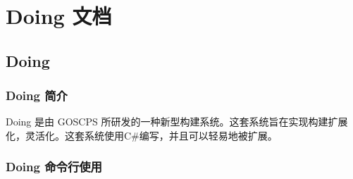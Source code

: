 \chapter{Doing 文档}
\section{Doing}
\subsection{Doing 简介}

Doing 是由 GOSCPS 所研发的一种新型构建系统。这套系统旨在实现构建扩展化，灵活化。这套系统使用C\#{}编写，并且可以轻易地被扩展。

\subsection{Doing 命令行使用}

